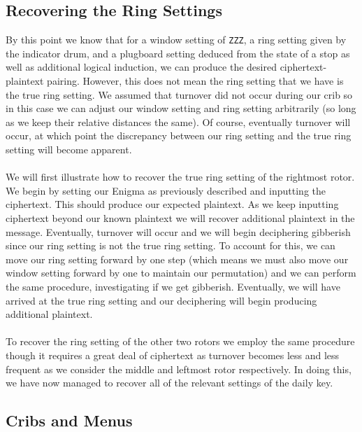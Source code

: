 \subsection{Recovering the Ring Settings}
By this point we know that for a window setting of \texttt{ZZZ}, a ring setting given by the indicator drum, and a plugboard setting deduced from the state of a stop as well as additional logical induction, we can produce the desired ciphertext-plaintext pairing. However, this does not mean the ring setting that we have is the true ring setting. We assumed that turnover did not occur during our crib so in this case we can adjust our window setting and ring setting arbitrarily (so long as we keep their relative distances the same). Of course, eventually turnover will occur, at which point the discrepancy between our ring setting and the true ring setting will become apparent.
\\\\We will first illustrate how to recover the true ring setting of the rightmost rotor. We begin by setting our Enigma as previously described and inputting the ciphertext. This should produce our expected plaintext. As we keep inputting ciphertext beyond our known plaintext we will recover additional plaintext in the message. Eventually, turnover will occur and we will begin deciphering gibberish since our ring setting is not the true ring setting. To account for this, we can move our ring setting forward by one step (which means we must also move our window setting forward by one to maintain our permutation) and we can perform the same procedure, investigating if we get gibberish. Eventually, we will have arrived at the true ring setting and our deciphering will begin producing additional plaintext.
\\\\To recover the ring setting of the other two rotors we employ the same procedure though it requires a great deal of ciphertext as turnover becomes less and less frequent as we consider the middle and leftmost rotor respectively. In doing this, we have now managed to recover all of the relevant settings of the daily key.
\subsection{Cribs and Menus}

